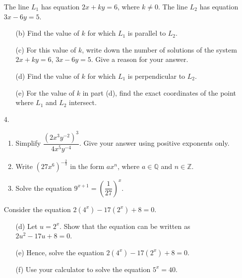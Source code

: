 \documentclass[12pt, twoside]{article}
\begin{document}
\begin{enumerate}[itemsep=0.15cm]
The line $L_{1}$ has equation $2x + ky = 6$, where $k \neq 0$. The line
$L_{2}$ has equation $3x - 6y = 5$.

\begin{enumerate}[itemsep=0.1cm]
  \item[(b)] Find the value of $k$ for which $L_{1}$ is parallel to
  $L_{2}$.
  \item[(c)] For this value of $k$, write down the number of solutions of
  the system $2x + ky = 6$, $3x - 6y = 5$. Give a reason for your answer.
  \item[(d)] Find the value of $k$ for which $L_{1}$ is perpendicular to
  $L_{2}$.
  \item[(e)] For the value of $k$ in part (d), find the exact coordinates
  of the point where $L_{1}$ and $L_{2}$ intersect.
\end{enumerate}


\newpage

\item[4.]

\begin{enumerate}[itemsep=0.1cm]
  \item Simplify $\dfrac{\left(2x^{3}y^{-2}\right)^{3}}{4x^{5}y^{-4}}$.
  Give your answer using positive exponents only.
  \item Write $\left(27x^{6}\right)^{-\frac{2}{3}}$ in the form $ax^{n}$,
  where $a \in \mathbb{Q}$ and $n \in \mathbb{Z}$.
  \item Solve the equation $9^{x + 1} = \left(\dfrac{1}{27}\right)^{x}$.
\end{enumerate}

Consider the equation $2\left(4^{x}\right) - 17\left(2^{x}\right) + 8 = 0$.

\begin{enumerate}[itemsep=0.1cm]
  \item[(d)] Let $u = 2^{x}$. Show that the equation can be written as
  $2u^{2} - 17u + 8 = 0$.
  \item[(e)] Hence, solve the equation $2\left(4^{x}\right) - 17\left(2^{x}\right) + 8 = 0$.
  \item[(f)] Use your calculator to solve the equation $5^{x} = 40$.
\end{enumerate}


\end{enumerate}
\end{document}
